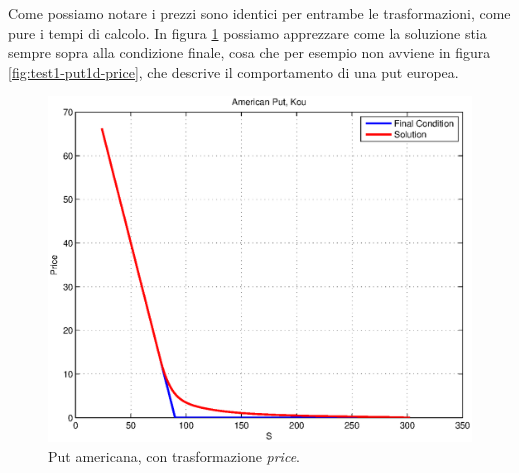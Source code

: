 \documentclass[a4paper,10pt]{report}
\theoremstyle{plain}
\theoremstyle{definition}
\theoremstyle{remark}
\begin{document}
Come possiamo notare i prezzi sono identici per entrambe le trasformazioni, come pure i tempi di calcolo. In figura \ref{fig:test2-putamkou} possiamo apprezzare come la soluzione stia sempre sopra alla condizione finale, cosa che per esempio non avviene in figura \ref{fig:test1-put1d-price}, che descrive il comportamento di una put europea.
\begin{figure}[htp!]
\begin{center}
\includegraphics[width=12cm]{img/test2-putamkou.eps}
\caption{Put americana, con trasformazione \emph{price}.}
\label{fig:test2-putamkou}
\end{center}
\end{figure}
\newpage
\end{document}
